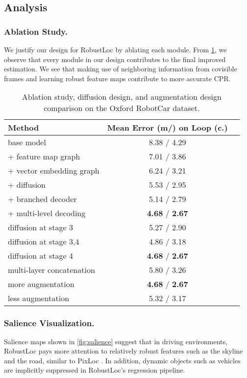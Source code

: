 \documentclass[letterpaper]{article} \usepackage{aaai23}  \usepackage{times}  \usepackage{helvet}  \usepackage{courier}  \usepackage[hyphens]{url}  \usepackage{graphicx} \urlstyle{rm} \def\UrlFont{\rm}  \usepackage{natbib}  \usepackage{caption} \frenchspacing  \setlength{\pdfpagewidth}{8.5in} \setlength{\pdfpageheight}{11in} \usepackage{booktabs}
\theoremstyle{remark}
\theoremstyle{plain}
\begin{document}
\subsection{Analysis}
\subsubsection{Ablation Study.}
We justify our design for RobustLoc by ablating each module. From \cref{tab:ablation study}, we observe that every module in our design contributes to the final improved estimation. We see that making use of neighboring information from covisible frames and learning robust feature maps contribute to more accurate CPR.

\begin{table}[!htb]\footnotesize
\centering
\begin{tabular}{l  c  c } 
\toprule
\multirow{1}{*}{Method} & \multicolumn{1}{c}{ Mean Error (m/) on Loop (c.)} \\
\midrule
base model  &  8.38 / 4.29 \\
+ feature map graph & 7.01 / 3.86 \\
+ vector embedding graph & 6.24 / 3.21\\
+ diffusion &  5.53 / 2.95\\
+ branched decoder &  5.14 / 2.79\\
+ multi-level decoding & \textbf{4.68} / \textbf{2.67} \\
\midrule
diffusion at stage 3 & 5.27 / 2.90  \\
diffusion at stage 3,4 & 4.86 / 3.18 \\
diffusion at stage 4 & \textbf{4.68} / \textbf{2.67}  \\
multi-layer concatenation & 5.80 / 3.26  \\
\midrule
more augmentation & \textbf{4.68} / \textbf{2.67}  \\
less augmentation & 5.32 / 3.17  \\
\bottomrule
\end{tabular}
\caption{Ablation study, diffusion design, and augmentation design comparison on the Oxford RobotCar dataset.}
\label{tab:ablation study}
\end{table}


\subsubsection{Salience Visualization.}
Salience maps shown in \cref{fig:salience} suggest that in driving environments, RobustLoc pays more attention to relatively robust features such as the skyline and the road, similar to PixLoc \cite{pixloc}. In addition, dynamic objects such as vehicles are implicitly suppressed in RobustLoc's regression pipeline.
\end{document}
